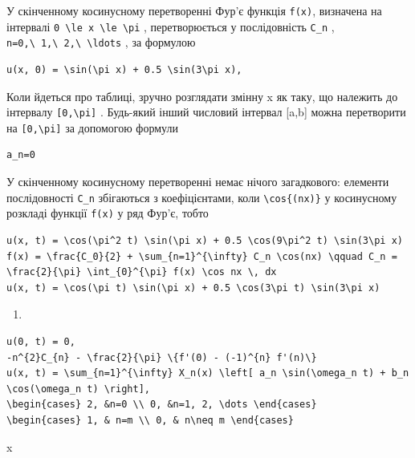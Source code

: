 \documentclass[
  ukrainian,
]{article}
\providecommand{\tightlist}{%
  \setlength{\itemsep}{0pt}\setlength{\parskip}{0pt}}
\begin{document}
У скінченному косинусному перетворенні Фур'є функція \texttt{f(x)},
визначена на інтервалі
\texttt{0\ \textbackslash{}le\ x\ \textbackslash{}le\ \textbackslash{}pi}
, перетворюється у послідовність \texttt{C\_n} ,
\texttt{n=0,\textbackslash{}\ 1,\textbackslash{}\ 2,\textbackslash{}\ \textbackslash{}ldots}
, за формулою

\begin{verbatim}
u(x, 0) = \sin(\pi x) + 0.5 \sin(3\pi x),
\end{verbatim}

Коли йдеться про таблиці, зручно розглядати змінну x як таку, що
належить до інтервалу \texttt{{[}0,\textbackslash{}pi{]}} . Будь-який
інший числовий інтервал {[}a,b{]} можна перетворити на
\texttt{{[}0,\textbackslash{}pi{]}} за допомогою формули

\begin{verbatim}
a_n=0
\end{verbatim}

У скінченному косинусному перетворенні немає нічого загадкового:
елементи послідовності \texttt{C\_n} збігаються з коефіцієнтами, коли
\texttt{\textbackslash{}cos\{(nx)\}} у косинусному розкладі функції
\texttt{f(x)} у ряд Фур'є, тобто

\begin{verbatim}
u(x, t) = \cos(\pi^2 t) \sin(\pi x) + 0.5 \cos(9\pi^2 t) \sin(3\pi x)
f(x) = \frac{C_0}{2} + \sum_{n=1}^{\infty} C_n \cos(nx) \qquad C_n = \frac{2}{\pi} \int_{0}^{\pi} f(x) \cos nx \, dx
u(x, t) = \cos(\pi t) \sin(\pi x) + 0.5 \cos(3\pi t) \sin(3\pi x)
\end{verbatim}

\begin{enumerate}
\def\labelenumi{\arabic{enumi}.}
\tightlist
\item
\end{enumerate}

\begin{verbatim}
u(0, t) = 0,
-n^{2}C_{n} - \frac{2}{\pi} \{f'(0) - (-1)^{n} f'(n)\}
u(x, t) = \sum_{n=1}^{\infty} X_n(x) \left[ a_n \sin(\omega_n t) + b_n \cos(\omega_n t) \right],
\begin{cases} 2, &n=0 \\ 0, &n=1, 2, \dots \end{cases}
\begin{cases} 1, & n=m \\ 0, & n\neq m \end{cases}
\end{verbatim}

x
\end{document}
